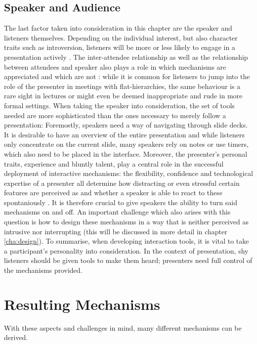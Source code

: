\subsection{Speaker and Audience}
The last factor taken into consideration in this chapter are the speaker and listeners themselves. Depending on the individual interest, but also character traits such as introversion, listeners will be more or less likely to engage in a presentation actively \cite{Bry:Backstage}. The inter-attendee relationship as well as the relationship between attendees and speaker also plays a role in which mechanisms are appreciated and which are not \cite{Moore:ThreeTypesOfInteraction}: while it is common for listeners to jump into the role of the presenter in meetings with flat-hierarchies, the same behaviour is a rare sight in lectures or might even be deemed inappropriate and rude in more formal settings. When taking the speaker into consideration, the set of tools needed are more sophisticated than the ones necessary to merely follow a presentation: Foremostly, speakers need a way of navigating through slide decks. It is desirable to have an overview of the entire presentation and while listeners only concentrate on the current slide, many speakers rely on notes or use timers, which also need to be placed in the interface.
Moreover, the presenter's personal traits, experience and bluntly talent, play a central role in the successful deployment of interactive mechanisms: the flexibility, confidence and technological expertise of a presenter all determine how distracting or even stressful certain features are perceived as and whether a speaker is able to react to these spontaniously \cite{Wacker:PresenterExperience}. It is therefore crucial to give speakers the ability to turn said mechanisms on and off. An important challenge which also arises with this question is how to design these mechanisms in a way that is neither perceived as intrusive nor interrupting (this will be discussed in more detail in chapter \ref{cha:design}).
To summarise, when developing interaction tools, it is vital to take a participant's personality into consideration. In the context of presentation, shy listeners should be given tools to make them heard; presenters need full control of the mechanisms provided.

\section{Resulting Mechanisms}
With these aspects and challenges in mind, many different mechanisms can be derived. 

\subsection{}

